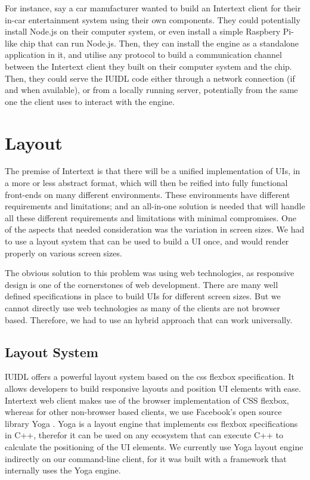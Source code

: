 For instance, say a car manufacturer wanted to build an Intertext client for their in-car entertainment system using their own components. They could potentially install Node.js on their computer system, or even install a simple Raspbery Pi-like chip that can run Node.js. Then, they can install the engine as a standalone application in it, and utilise any protocol to build a communication channel between the Intertext client they built on their computer system and the chip. Then, they could serve the IUIDL code either through a network connection (if and when available), or from a locally running server, potentially from the same one the client uses to interact with the engine. 

\section{Layout}

The premise of Intertext is that there will be a unified implementation of UIs, in a more or less abstract format, which will then be reified into fully functional front-ends on many different environments. These environments have different requirements and limitations; and an all-in-one solution is needed that will handle all these different requirements and limitations with minimal compromises. One of the aspects that needed consideration was the variation in screen sizes. We had to use a layout system that can be used to build a UI once, and would render properly on various screen sizes.

The obvious solution to this problem was using web technologies, as responsive design is one of the cornerstones of web development. There are many well defined specifications in place to build UIs for different screen sizes. But we cannot directly use web technologies as many of the clients are not browser based. Therefore, we had to use an hybrid approach that can work universally.

\subsection{Layout System}

IUIDL offers a powerful layout system based on the css flexbox specification. It allows developers to build responsive layouts and position UI elements with ease. Intertext web client makes use of the browser implementation of CSS flexbox, whereas for other non-browser based clients, we use Facebook's open source library Yoga \cite{FacebookYoga}. Yoga is a layout engine that implements css flexbox specifications in C++, therefor it can be used on any ecosystem that can execute C++ to calculate the positioning of the UI elements. We currently use Yoga layout engine indirectly on our command-line client, for it was built with a framework that internally uses the Yoga engine.

